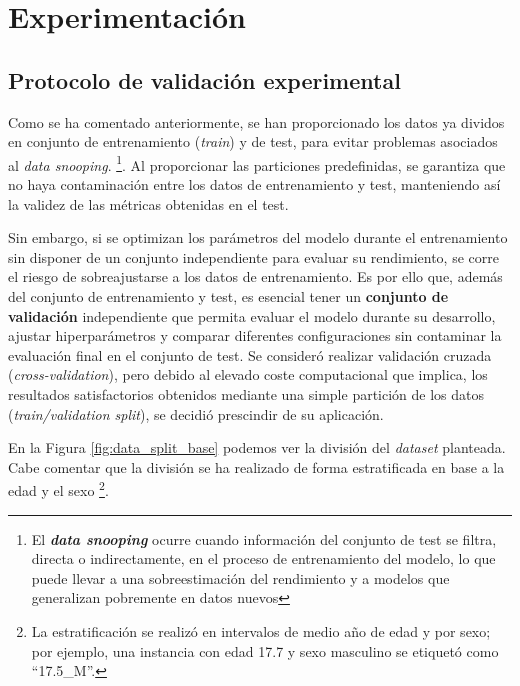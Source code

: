 \chapter{Experimentación}



\section{Protocolo de validación experimental}

Como se ha comentado anteriormente, se han proporcionado los datos ya dividos en conjunto de entrenamiento
(\textit{train}) y de test, para evitar problemas asociados al \textit{data snooping}. 
\footnote{
    El \textbf{\textit{data snooping}} ocurre cuando información del conjunto de test se filtra, directa 
    o indirectamente, en el proceso de entrenamiento del modelo, lo que puede llevar a una sobreestimación del 
    rendimiento y a modelos que generalizan pobremente en datos nuevos
}.
Al proporcionar las particiones predefinidas, se garantiza que no haya contaminación entre los datos de 
entrenamiento y test, manteniendo así la validez de las métricas obtenidas en el test. 

Sin embargo, si se optimizan los parámetros del modelo durante el entrenamiento sin disponer de un conjunto 
independiente para evaluar su rendimiento, se corre el riesgo de sobreajustarse a los datos de entrenamiento.
Es por ello que, además del conjunto de entrenamiento y test, es esencial tener un \textbf{conjunto de 
validación} independiente que permita evaluar el modelo durante su desarrollo, ajustar hiperparámetros y 
comparar diferentes configuraciones sin contaminar la evaluación final en el conjunto de test.
Se consideró realizar validación cruzada (\textit{cross-validation}), pero debido al elevado coste 
computacional que implica, los resultados satisfactorios obtenidos mediante una simple partición de los datos 
(\textit{train/validation split}), se decidió prescindir de su aplicación.

En la Figura \ref{fig:data_split_base} podemos ver la división del \textit{dataset} planteada. Cabe comentar
que la división se ha realizado de forma estratificada en base a la edad y el sexo
\footnote{La estratificación se realizó en intervalos de medio año de edad y por sexo; por ejemplo, una 
instancia con edad 17.7 y sexo masculino se etiquetó como ``17.5\_M''.}.

